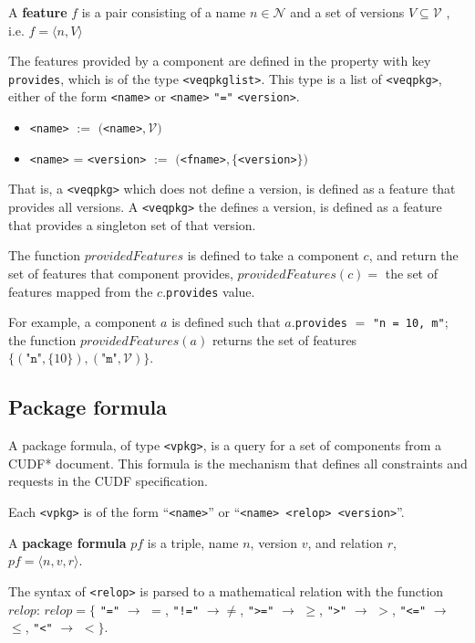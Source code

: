 \begin{defs}
A \textbf{feature} $f$ is a pair consisting of a name $n \in \mathcal{N}$ and a set of versions $V \subseteq \mathcal{V}$ , 
i.e. $f = \langle n,V \rangle$
\end{defs}

The features provided by a component are defined in the property with key \verb+provides+, which is of the type \texttt{<veqpkglist>}.
This type is a list of \texttt{<veqpkg>}, either of the form \verb+<name>+ or  \verb+<name>+ \texttt{"="} \verb+<version>+.
\begin{itemize}
  \item \verb+<name>+ $:=$ $($\verb+<name>+$,\mathcal{V})$
  \item \verb+<name>+ = \verb+<version>+ $:=$ $($\verb+<fname>+$,\{$\verb+<version>+$\})$
\end{itemize}
That is, a \texttt{<veqpkg>} which does not define a version, is defined as a feature that provides all versions.
A  \texttt{<veqpkg>} the defines a version, is defined as a feature that provides a singleton set of that version.

\begin{defs}
The function $providedFeatures$ is defined to take a component $c$, and return the set of features that component provides,
$providedFeatures(c) =$ the set of features mapped from the $c$.\texttt{provides} value.
\end{defs}

For example, a component $a$ is defined such that $a.$\texttt{provides} $=$ \texttt{"n = 10, m"};
the function $providedFeatures(a)$ returns the set of features $\{( \texttt{"n"},\{10\} ), ( \texttt{"m"},\mathcal{V})\}$.

\subsection{Package formula}
A package formula, of type \texttt{<vpkg>}, is a query for a set of components from a CUDF* document.
This formula is the mechanism that defines all constraints and requests in the CUDF specification.

Each \texttt{<vpkg>} is of the form ``\texttt{<name>}'' or  ``\texttt{<name> <relop> <version>}''.
\begin{defs}
A \textbf{package formula} $pf$ is a triple, name $n$, version $v$, and relation $r$, $pf = \langle n, v , r \rangle$.
\end{defs}

The syntax of \verb+<relop>+ is parsed to a mathematical relation with the function $relop$:  
$relop = \{$ \verb+"="+ $\rightarrow$ $=$, \verb+"!="+ $\rightarrow \not =$, 
\verb+">="+ $\rightarrow$ $\geq$, \verb+">"+ $\rightarrow$ $>$, \verb+"<="+ $\rightarrow$ $\leq$, \verb+"<"+ $\rightarrow$ $<$$\}$.


